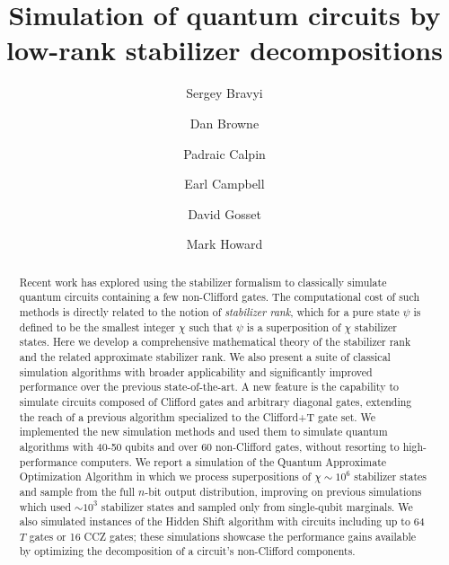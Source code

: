 \documentclass[a4paper,aps, noarxiv,onecolumn, accepted=2019-06-19]{quantumarticle}
\begin{document}
\title{Simulation of quantum circuits by low-rank stabilizer decompositions}

\author{Sergey Bravyi}
\author{Dan Browne}
\author{Padraic Calpin}
\author{Earl Campbell}
\author{David Gosset}
\author{Mark Howard} 

\begin{abstract}

Recent work has explored using the stabilizer formalism to classically simulate quantum circuits containing a few non-Clifford gates. The computational cost of such methods is directly related to the notion of {\em stabilizer rank}, which for a pure state $\psi$ is defined to be the smallest integer $\chi$ such that  $\psi$ is a superposition of $\chi$ stabilizer states.  Here we develop a comprehensive mathematical theory of the stabilizer rank and the related approximate stabilizer rank.  We also present a suite of classical simulation algorithms with broader applicability and significantly improved performance over the previous state-of-the-art.  A new feature is the capability to simulate circuits composed of Clifford gates and arbitrary diagonal gates, extending the reach of a previous algorithm specialized to the Clifford+T gate set. We implemented the new simulation methods and used them to simulate quantum algorithms with 40-50 qubits and over 60 non-Clifford gates, without resorting to high-performance computers. We report a simulation of the Quantum Approximate Optimization Algorithm in which we process superpositions of $\chi\sim10^6$ stabilizer states and sample from the full $n$-bit output distribution, improving on previous simulations which used $\sim 10^3$ stabilizer states and sampled only from single-qubit marginals. We also simulated instances of the Hidden Shift algorithm with circuits including up to 64 $T$ gates or 16 CCZ gates; these simulations showcase the performance gains available by optimizing the decomposition of a circuit's non-Clifford components.
\end{abstract}
	
\end{document}
